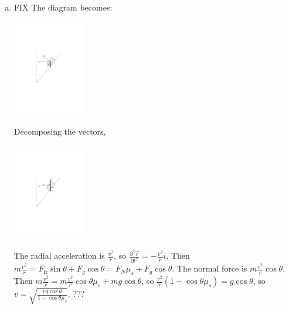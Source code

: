 \documentclass{esg8012pset}
\begin{document}
\begin{solution}
\begin{enumerate}[a)]
    \item FIX The diagram becomes: \begin{center}\includegraphics[width=0.25\textwidth]{2009-09-25_Diagram_8}\end{center}  Decomposing the vectors, \begin{center}\includegraphics[width=0.25\textwidth]{2009-09-25_Diagram_9}\end{center}  The radial acceleration is $\frac{v^2}{r}$, so $\frac{\partial^2 \vec r}{\partial t^2} = -\frac{v^2}{r}\hat i$.  Then $m\frac{v^2}{r} = F_{\text{fr}}\sin\theta + F_g\cos\theta = F_N \mu_s + F_g\cos\theta$.  The normal force is $m\frac{v^2}{r}\cos\theta$.  Then $m\frac{v^2}{r} = m\frac{v^2}{r}\cos\theta \mu_s + mg\cos\theta$, so $\frac{v^2}{r}(1 - \cos\theta \mu_s) = g\cos\theta$, so $v = \sqrt{\frac{rg\cos\theta}{1-\cos\theta\mu_s}}$. ???
  \end{enumerate}
  
  \noindent 
\end{solution}
\end{document}
